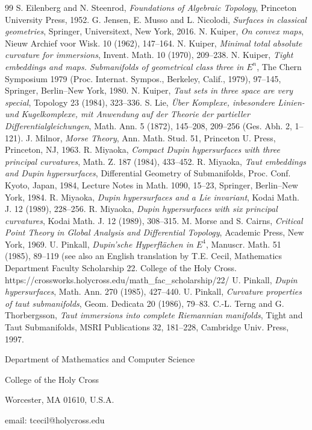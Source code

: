 \documentclass[12pt]{article}
\begin{document}
\begin{thebibliography}{99}
 S. Eilenberg and N. Steenrod, {\em Foundations of Algebraic Topology}, Princeton University Press, 1952.
 G. Jensen, E. Musso and L. Nicolodi, {\em Surfaces in classical geometries}, 
Springer, Universitext, New York, 2016.
 N. Kuiper, {\em On convex maps}, Nieuw Archief
voor Wisk. 10 (1962), 147--164.
 N. Kuiper, {\em Minimal total
absolute curvature for immersions}, Invent. Math.  10 (1970), 209--238.
 N. Kuiper, {\em Tight embeddings
and maps.  Submanifolds of geometrical class three in} $E^n$,
The Chern Symposium 1979 (Proc. Internat. Sympos., Berkeley,
Calif., 1979), 97--145, Springer, Berlin--New York, 1980. 
 N. Kuiper, {\em Taut sets in three space are very
special}, Topology 23 (1984), 323--336.
 S. Lie, {\em \"{U}ber Komplexe, inbesondere Linien-
und Kugelkomplexe, mit Anwendung auf der Theorie der partieller Differentialgleichungen},
Math. Ann. 5 (1872), 145--208, 209--256 (Ges. Abh. 2, 1--121).
 J. Milnor, {\em Morse Theory}, Ann. Math. Stud.  51,
Princeton U. Press, Princeton, NJ, 1963.
 R. Miyaoka, {\em Compact Dupin hypersurfaces
with three principal curvatures}, Math. Z. 187 (1984),
433--452.
 R. Miyaoka, {\em Taut embeddings
and Dupin hypersurfaces}, Differential Geometry of Submanifolds,
Proc. Conf. Kyoto, Japan, 1984, Lecture Notes in Math.  1090, 15--23,
Springer, Berlin--New York, 1984.
 R. Miyaoka,
{\em Dupin hypersurfaces and
a Lie invariant}, Kodai Math. J. 12 (1989), 228--256.
 R. Miyaoka,
{\em Dupin hypersurfaces with
six principal curvatures}, Kodai Math. J. 12 (1989), 
308--315.
M. Morse and S. Cairns, {\em Critical Point Theory
in Global Analysis and Differential Topology}, Academic Press,
New York, 1969.
 U. Pinkall, {\em Dupin'sche
Hyperfl\"{a}chen in $E^4$}, Manuscr. Math. 51 (1985), 89--119
(see also an English translation by T.E. Cecil, 
Mathematics Department Faculty Scholarship 22. College of the Holy Cross.\\
https://crossworks.holycross.edu/math\_fac\_scholarship/22/
 U. Pinkall, {\em Dupin
hypersurfaces}, Math. Ann. 270 (1985), 427--440.
 U. Pinkall, {\em Curvature
properties of taut submanifolds}, Geom. Dedicata  20 (1986), 79--83.
  C.-L. Terng and G. Thorbergsson, {\em Taut immersions
into complete Riemannian manifolds}, Tight and Taut Submanifolds, MSRI
Publications  32, 181--228, Cambridge Univ. Press, 1997. 
\end{thebibliography}


\noindent Department of Mathematics and Computer Science

\noindent College of the Holy Cross

\noindent Worcester, MA 01610, U.S.A.

\noindent email: tcecil@holycross.edu
\end{document}
